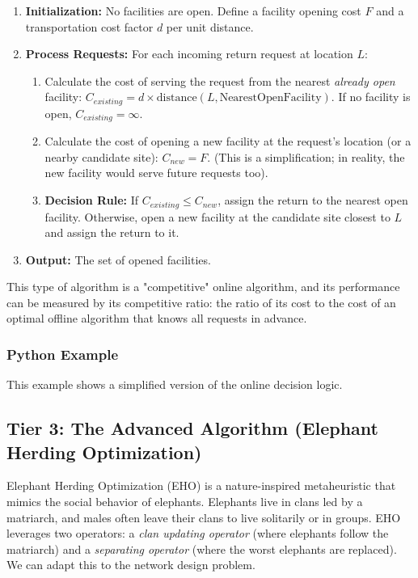 \documentclass{article}
\begin{document}
\begin{enumerate}
    \item \textbf{Initialization:} No facilities are open. Define a facility opening cost $F$ and a transportation cost factor $d$ per unit distance.
    \item \textbf{Process Requests:} For each incoming return request at location $L$:
    \begin{enumerate}
        \item Calculate the cost of serving the request from the nearest \textit{already open} facility: $C_{existing} = d \times \text{distance}(L, \text{NearestOpenFacility})$. If no facility is open, $C_{existing} = \infty$.
        \item Calculate the cost of opening a new facility at the request's location (or a nearby candidate site): $C_{new} = F$. (This is a simplification; in reality, the new facility would serve future requests too).
        \item \textbf{Decision Rule:} If $C_{existing} \leq C_{new}$, assign the return to the nearest open facility. Otherwise, open a new facility at the candidate site closest to $L$ and assign the return to it.
    \end{enumerate}
    \item \textbf{Output:} The set of opened facilities.
\end{enumerate}

This type of algorithm is a "competitive" online algorithm, and its performance can be measured by its competitive ratio: the ratio of its cost to the cost of an optimal offline algorithm that knows all requests in advance.

\subsubsection{Python Example}
This example shows a simplified version of the online decision logic.



\subsection{Tier 3: The Advanced Algorithm (Elephant Herding Optimization)}
Elephant Herding Optimization (EHO) is a nature-inspired metaheuristic that mimics the social behavior of elephants. Elephants live in clans led by a matriarch, and males often leave their clans to live solitarily or in groups. EHO leverages two operators: a \textit{clan updating operator} (where elephants follow the matriarch) and a \textit{separating operator} (where the worst elephants are replaced). We can adapt this to the network design problem.
\end{document}

